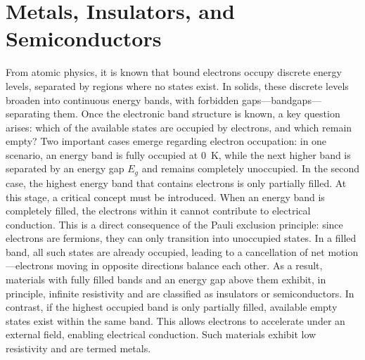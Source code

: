 \section{Metals, Insulators, and Semiconductors}
From atomic physics, it is known that bound electrons occupy discrete energy levels, separated by regions where no states exist. In solids, these discrete levels broaden into continuous energy bands, with forbidden gaps—bandgaps—separating them. Once the electronic band structure is known, a key question arises: which of the available states are occupied by electrons, and which remain empty?
Two important cases emerge regarding electron occupation: in one scenario, an energy band is fully occupied at 0~K, while the next higher band is separated by an energy gap \( E_g \) and remains completely unoccupied. In the second case, the highest energy band that contains electrons is only partially filled.
At this stage, a critical concept must be introduced. When an energy band is completely filled, the electrons within it cannot contribute to electrical conduction. This is a direct consequence of the Pauli exclusion principle: since electrons are fermions, they can only transition into unoccupied states. In a filled band, all such states are already occupied, leading to a cancellation of net motion—electrons moving in opposite directions balance each other. As a result, materials with fully filled bands and an energy gap above them exhibit, in principle, infinite resistivity and are classified as insulators or semiconductors.
In contrast, if the highest occupied band is only partially filled, available empty states exist within the same band. This allows electrons to accelerate under an external field, enabling electrical conduction. Such materials exhibit low resistivity and are termed metals.
